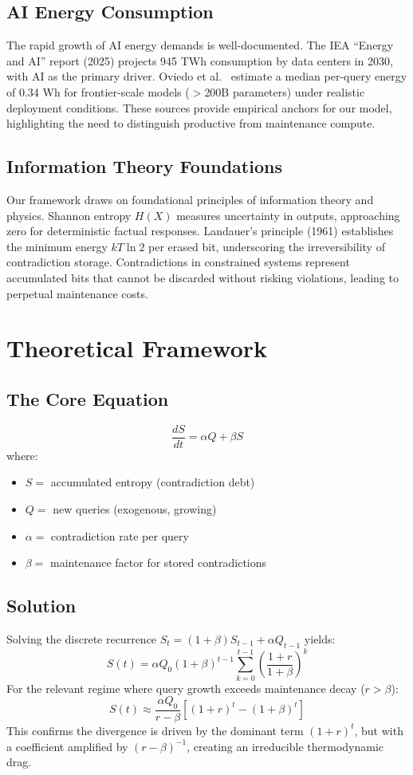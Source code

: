 \documentclass[11pt,a4paper]{article}
\begin{document}
\subsection{AI Energy Consumption}
The rapid growth of AI energy demands is well-documented. The IEA ``Energy and AI'' report (2025) \cite{iea2025} projects 945 TWh consumption by data centers in 2030, with AI as the primary driver. Oviedo et al.\ \cite{arxiv2509} estimate a median per-query energy of 0.34 Wh for frontier-scale models ($>$200B parameters) under realistic deployment conditions. These sources provide empirical anchors for our model, highlighting the need to distinguish productive from maintenance compute.

\subsection{Information Theory Foundations}
Our framework draws on foundational principles of information theory and physics. Shannon entropy $H(X)$ measures uncertainty in outputs, approaching zero for deterministic factual responses. Landauer's principle (1961) \cite{landauer1961} establishes the minimum energy $kT \ln 2$ per erased bit, underscoring the irreversibility of contradiction storage. Contradictions in constrained systems represent accumulated bits that cannot be discarded without risking violations, leading to perpetual maintenance costs.

\section{Theoretical Framework}

\subsection{The Core Equation}
\[
\frac{dS}{dt} = \alpha Q + \beta S
\]
where:
\begin{itemize}
    \item $S =$ accumulated entropy (contradiction debt)
    \item $Q =$ new queries (exogenous, growing)
    \item $\alpha =$ contradiction rate per query
    \item $\beta =$ maintenance factor for stored contradictions
\end{itemize}

\subsection{Solution}
Solving the discrete recurrence $S_t = (1+\beta)S_{t-1} + \alpha Q_{t-1}$ yields:
\[
S(t) = \alpha Q_0 (1+\beta)^{t-1} \sum_{k=0}^{t-1} \left(\frac{1+r}{1+\beta}\right)^{k}
\]
For the relevant regime where query growth exceeds maintenance decay ($r > \beta$):
\begin{equation}
S(t) \approx \frac{\alpha Q_0}{r-\beta} [(1+r)^t - (1+\beta)^t]
\end{equation}
This confirms the divergence is driven by the dominant term $(1+r)^t$, but with a coefficient amplified by $(r-\beta)^{-1}$, creating an irreducible thermodynamic drag.
\end{document}
